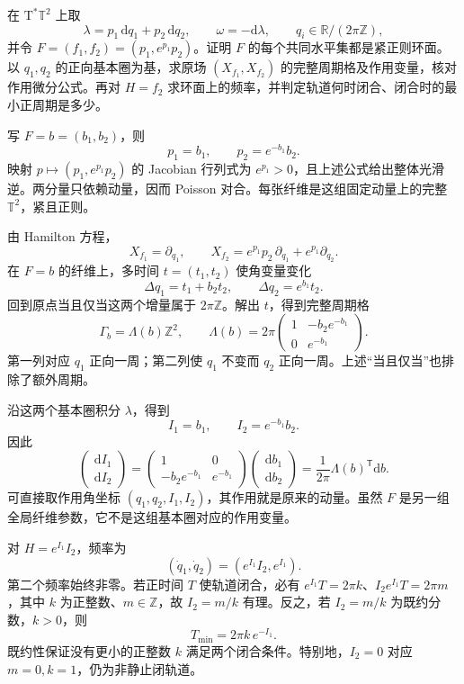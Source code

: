 \begin{exercise}\label{g4:ex:1102:nonlinear-integral-parameters}
	在 \(\mathrm{T}^*\mathbb T^2\) 上取
	\[
		\lambda=p_1\,\mathrm{d}q_1+p_2\,\mathrm{d}q_2,\qquad
		\omega=-\mathrm{d}\lambda,\qquad
		q_i\in\mathbb R/(2\pi\mathbb Z),
	\]
	并令 \(F=(f_1,f_2)=(p_1,e^{p_1}p_2)\)。证明 \(F\) 的每个共同水平集都是紧正则环面。以 \(q_1,q_2\) 的正向基本圈为基，求原场 \((X_{f_1},X_{f_2})\) 的完整周期格及作用变量，核对作用微分公式。再对 \(H=f_2\) 求环面上的频率，并判定轨道何时闭合、闭合时的最小正周期是多少。
\end{exercise}
\begin{solution}
	写 \(F=b=(b_1,b_2)\)，则
	\[
		p_1=b_1,\qquad p_2=e^{-b_1}b_2.
	\]
	映射 \(p\mapsto(p_1,e^{p_1}p_2)\) 的 Jacobian 行列式为 \(e^{p_1}>0\)，且上述公式给出整体光滑逆。两分量只依赖动量，因而 Poisson 对合。每张纤维是这组固定动量上的完整 \(\mathbb T^2\)，紧且正则。

	由 Hamilton 方程，
	\[
		X_{f_1}=\partial_{q_1},\qquad
		X_{f_2}=e^{p_1}p_2\,\partial_{q_1}
			+e^{p_1}\partial_{q_2}.
	\]
	在 \(F=b\) 的纤维上，多时间 \(t=(t_1,t_2)\) 使角变量变化
	\[
		\Delta q_1=t_1+b_2t_2,\qquad
		\Delta q_2=e^{b_1}t_2.
	\]
	回到原点当且仅当这两个增量属于 \(2\pi\mathbb Z\)。解出 \(t\)，得到完整周期格
	\[
		\Gamma_b=\Lambda(b)\mathbb Z^2,\qquad
		\Lambda(b)=2\pi
		\begin{pmatrix}
			1&-b_2e^{-b_1}\\
			0&e^{-b_1}
		\end{pmatrix}.
	\]
	第一列对应 \(q_1\) 正向一周；第二列使 \(q_1\) 不变而 \(q_2\) 正向一周。上述“当且仅当”也排除了额外周期。

	沿这两个基本圈积分 \(\lambda\)，得到
	\[
		I_1=b_1,\qquad I_2=e^{-b_1}b_2.
	\]
	因此
	\[
		\begin{pmatrix}\mathrm{d}I_1\\ \mathrm{d}I_2\end{pmatrix}
		=
		\begin{pmatrix}
			1&0\\
			-b_2e^{-b_1}&e^{-b_1}
		\end{pmatrix}
		\begin{pmatrix}\mathrm{d}b_1\\ \mathrm{d}b_2\end{pmatrix}
		=\frac1{2\pi}\Lambda(b)^{\mathsf T}\mathrm{d}b.
	\]
	可直接取作用角坐标 \((q_1,q_2,I_1,I_2)\)，其作用就是原来的动量。虽然 \(F\) 是另一组全局纤维参数，它不是这组基本圈对应的作用变量。

	对 \(H=e^{I_1}I_2\)，频率为
	\[
		(\dot q_1,\dot q_2)=(e^{I_1}I_2,e^{I_1}).
	\]
	第二个频率始终非零。若正时间 \(T\) 使轨道闭合，必有
	\(e^{I_1}T=2\pi k\)、\(I_2e^{I_1}T=2\pi m\)，其中 \(k\) 为正整数、\(m\in\mathbb Z\)，故 \(I_2=m/k\) 有理。反之，若 \(I_2=m/k\) 为既约分数，\(k>0\)，则
	\[
		T_{\min}=2\pi k\,e^{-I_1}.
	\]
	既约性保证没有更小的正整数 \(k\) 满足两个闭合条件。特别地，\(I_2=0\) 对应 \(m=0,k=1\)，仍为非静止闭轨道。
\end{solution}

